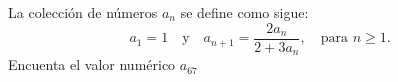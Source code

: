 La colección de números $a_n$ se define como sigue:
\[a_1=1\quad\text{y}\quad a_{n+1}=\frac{2a_n}{2+3a_n},\quad\text{para }n\geq 1.\]
Encuenta el valor numérico $a_{67}$